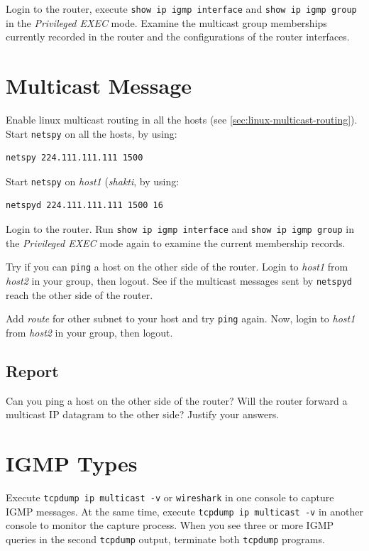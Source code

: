 \documentclass{../UTNetLab}
\begin{document}
    Login to the router, execute \lstinline{show ip igmp interface} and \lstinline{show ip igmp group} in the \textit{Privileged EXEC} mode.
    Examine the multicast group memberships currently recorded in the router and the configurations of the router interfaces.

\section{Multicast Message}
    Enable linux multicast routing in all the hosts (see \autoref{sec:linux-multicast-routing}).\\
    Start \lstinline{netspy} on all the hosts, by using:
    \begin{lstlisting}
netspy 224.111.111.111 1500
    \end{lstlisting}
    Start \lstinline{netspy} on \textit{host1} (\textit{shakti}, by using:
    \begin{lstlisting}
netspyd 224.111.111.111 1500 16
    \end{lstlisting}
    
    Login to the router.
    Run \lstinline[language={cisco}]{show ip igmp interface} and \lstinline[language={cisco}]{show ip igmp group} in the \textit{Privileged EXEC} mode again to examine the current membership records.

    Try if you can \lstinline{ping} a host on the other side of the router.
    Login to \textit{host1} from \textit{host2} in your group, then logout.
    See if the multicast messages sent by \lstinline{netspyd} reach the other side of the router.

    Add \textit{route} for other subnet to your host and try \lstinline{ping} again. Now, login to \textit{host1} from \textit{host2} in your group, then logout.
    
    \subsection*{Report}
    Can you ping a host on the other side of the router?
    Will the router forward a multicast IP datagram to the other side?
    Justify your answers.

\section{IGMP Types}
    Execute \lstinline{tcpdump ip multicast -v} or \lstinline{wireshark} in one console to capture IGMP messages.
    At the same time, execute \lstinline{tcpdump ip multicast -v} in another console to monitor the capture process.
    When you see three or more IGMP queries in the second \lstinline{tcpdump} output, terminate both \lstinline{tcpdump} programs.
\end{document}
